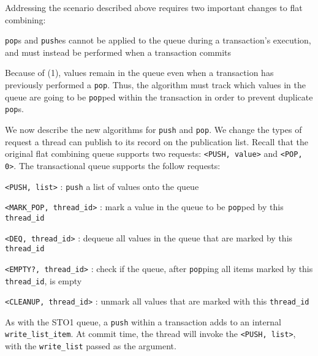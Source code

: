 Addressing the scenario described above requires two important changes to flat combining: 
\begin{ordlist}
\item \texttt{pop}s and \texttt{push}es cannot be applied to the queue during a transaction’s execution, and must instead be performed when a transaction commits
\item Because of (1), values remain in the queue even when a transaction has previously performed a \texttt{pop}. Thus, the algorithm must track which values in the queue are going to be \texttt{pop}ped within the transaction in order to prevent duplicate \texttt{pop}s.
\end{ordlist}

We now describe the new algorithms for \texttt{push} and \texttt{pop}.  We change the types of request a thread can publish to its record on the publication list. Recall that the original flat combining queue supports two requests: \texttt{<PUSH, value>} and \texttt{<POP, 0>}. The transactional queue supports the follow requests:
\begin{bullets}
    \item \texttt{<PUSH, list>} : \texttt{push} a list of values onto the queue
    \item \texttt{<MARK\_POP, thread\_id>} : mark a value in the queue to be \texttt{pop}ped by this \texttt{thread\_id}
    \item \texttt{<DEQ, thread\_id>} : dequeue all values in the queue that are marked by this \texttt{thread\_id}
    \item \texttt{<EMPTY?, thread\_id>} : check if the queue, after \texttt{pop}ping all items marked by this \texttt{thread\_id}, is empty
    \item \texttt{<CLEANUP, thread\_id>} : unmark all values that are marked with this \texttt{thread\_id}
\end{bullets}

As with the STO1 queue, a \texttt{push} within a transaction adds to an internal \texttt{write\_list\_item}. At commit time, the thread will invoke the \texttt{<PUSH, list>}, with the \texttt{write\_list} passed as the argument.

